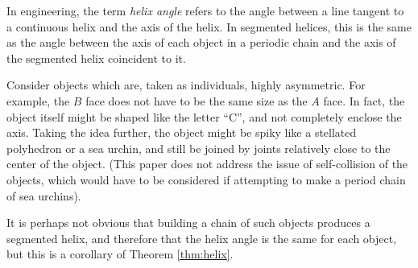 \documentclass{svproc}
\begin{document}




In engineering, the term {\em helix angle} refers
to the angle between a line tangent to a continuous helix and
the axis of the helix. In segmented helices, this is the same
as the angle between the
axis of each object in a periodic chain and the axis of the
segmented helix coincident to it.

Consider
objects which are, taken as individuals, highly asymmetric.
For example,
the $B$ face does not have to be the same size as the $A$ face. In fact,
the object itself might be shaped like the letter ``C'', and not completely
enclose the axis. Taking the idea further, the object might be spiky
like a stellated polyhedron or a sea urchin, and still be joined by
joints relatively close to the center of the object. (This paper does not
address the issue of self-collision of the objects,
which would have to be considered if attempting to make a period chain
of sea urchins).

It is perhaps not obvious that building a chain of such objects
produces a segmented helix, and therefore that the helix angle is the
same for each object, but this is a corollary of Theorem \ref{thm:helix}.
\end{document}
